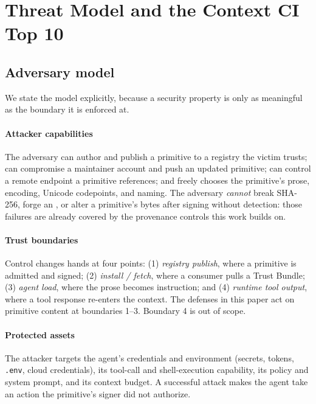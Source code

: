 
\section{Threat Model and the Context CI Top 10}
\label{sec:threat-model}

\subsection{Adversary model}
\label{subsec:adversary}

We state the model explicitly, because a security property is only as
meaningful as the boundary it is enforced at.

\paragraph{Attacker capabilities} The adversary can author and publish a
primitive to a registry the victim trusts; can compromise a maintainer
account and push an updated primitive; can control a remote endpoint a
primitive references; and freely chooses the primitive's prose,
encoding, Unicode codepoints, and naming. The adversary \emph{cannot}
break SHA-256, forge an \edsig{}, or alter a primitive's bytes after
signing without detection: those failures are already covered by the
provenance controls this work builds on.

\paragraph{Trust boundaries} Control changes hands at four points: (1)
\emph{registry publish}, where a primitive is admitted and signed; (2)
\emph{install / fetch}, where a consumer pulls a Trust Bundle; (3)
\emph{agent load}, where the prose becomes instruction; and (4)
\emph{runtime tool output}, where a tool response re-enters the context.
The defenses in this paper act on primitive content at boundaries 1--3.
Boundary 4 is out of scope.

\paragraph{Protected assets} The attacker targets the agent's
credentials and environment (secrets, tokens, \texttt{.env}, cloud
credentials), its tool-call and shell-execution capability, its policy
and system prompt, and its context budget. A successful attack makes the
agent take an action the primitive's signer did not authorize.

